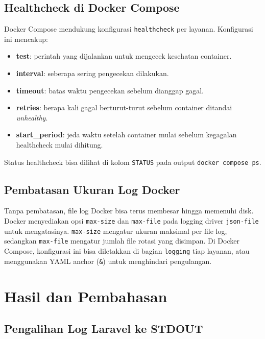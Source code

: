 \documentclass[a4paper,oneside,11pt]{book}
\begin{document}
\section{Healthcheck di Docker Compose}

Docker Compose mendukung konfigurasi \texttt{healthcheck} per layanan. Konfigurasi ini
mencakup:
\begin{itemize}
  \item \textbf{test}: perintah yang dijalankan untuk mengecek kesehatan container.
  \item \textbf{interval}: seberapa sering pengecekan dilakukan.
  \item \textbf{timeout}: batas waktu pengecekan sebelum dianggap gagal.
  \item \textbf{retries}: berapa kali gagal berturut-turut sebelum container ditandai \textit{unhealthy}.
  \item \textbf{start\_period}: jeda waktu setelah container mulai sebelum kegagalan healthcheck
        mulai dihitung.
\end{itemize}

Status healthcheck bisa dilihat di kolom \texttt{STATUS} pada output \texttt{docker compose ps}.

\section{Pembatasan Ukuran Log Docker}

Tanpa pembatasan, file log Docker bisa terus membesar hingga memenuhi disk. Docker menyediakan
opsi \texttt{max-size} dan \texttt{max-file} pada logging driver \texttt{json-file} untuk
mengatasinya. \texttt{max-size} mengatur ukuran maksimal per file log, sedangkan \texttt{max-file}
mengatur jumlah file rotasi yang disimpan. Di Docker Compose, konfigurasi ini bisa diletakkan
di bagian \texttt{logging} tiap layanan, atau menggunakan YAML anchor (\texttt{\&}) untuk
menghindari pengulangan.

\chapter{Hasil dan Pembahasan}

\section{Pengalihan Log Laravel ke STDOUT}
\end{document}
